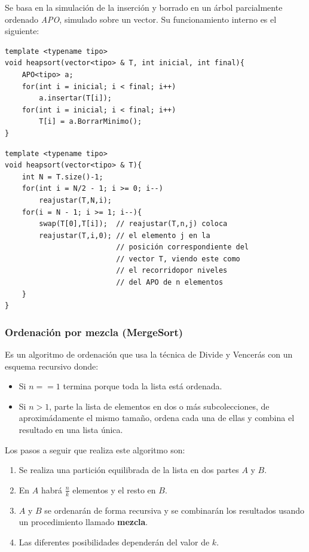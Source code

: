 \documentclass[10pt,a4paper,spanish]{report}
\theoremstyle{definition}
\theoremstyle{remark}
\begin{document}
Se basa en la simulación de la inserción y borrado en un árbol parcialmente ordenado \textit{\textcolor[rgb]{0.2,0.5,0.5}{APO}}, simulado sobre un vector. Su funcionamiento interno es el siguiente: 



\begin{verbatim}
template <typename tipo>
void heapsort(vector<tipo> & T, int inicial, int final){
    APO<tipo> a;
    for(int i = inicial; i < final; i++)
        a.insertar(T[i]);
    for(int i = inicial; i < final; i++)
        T[i] = a.BorrarMinimo();
}
\end{verbatim}

\begin{verbatim}
template <typename tipo>
void heapsort(vector<tipo> & T){
    int N = T.size()-1;
    for(int i = N/2 - 1; i >= 0; i--)
        reajustar(T,N,i);
    for(i = N - 1; i >= 1; i--){
        swap(T[0],T[i]);  // reajustar(T,n,j) coloca 
        reajustar(T,i,0); // el elemento j en la 
                          // posición correspondiente del 
                          // vector T, viendo este como
                          // el recorridopor niveles 
                          // del APO de n elementos
    }
}
\end{verbatim}

\subsubsection{\textcolor[rgb]{0.2,0.5,0.5}Ordenación por mezcla (MergeSort)}

Es un algoritmo de ordenación que usa la técnica de Divide y Vencerás con un esquema recursivo donde:
\begin{itemize}
    \item Si $n==1$ termina porque toda la lista está ordenada.
    \item Si $n>1$, parte la lista de elementos en dos o más subcolecciones, de aproximádamente el mismo tamaño, ordena cada una de ellas y combina el resultado en una lista única.
\end{itemize}

Los pasos a seguir que realiza este algoritmo son:
\begin{enumerate}[$\spadesuit$]
    \item Se realiza una partición equilibrada de la lista en dos partes $A$ y $B$.
    \item En $A$ habrá $\frac{n}{k}$ elementos y el resto en $B$.
    \item $A$ y $B$ se ordenarán de forma recursiva y se combinarán los resultados usando un procedimiento llamado \textbf{\textcolor[rgb]{0.2,0.5,0.5}{mezcla}}.
    \item Las diferentes posibilidades dependerán del valor de $k$.
\end{enumerate}
\end{document}
